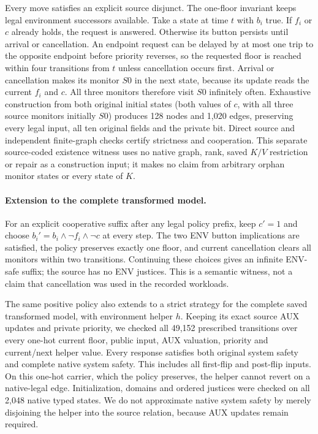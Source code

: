Every move satisfies an explicit source disjunct. The one-floor invariant
keeps legal environment successors available. Take a state at time $t$
with $b_i$ true. If $f_i$ or $c$ already holds, the request is answered.
Otherwise its button persists until arrival or cancellation. An endpoint
request can be delayed by at most one trip to the opposite endpoint
before priority reverses, so the requested floor is reached within four
transitions from $t$ unless cancellation occurs first. Arrival or
cancellation makes its monitor $S0$ in the next state, because its
update reads the current $f_i$ and $c$. All three monitors therefore visit $S0$ infinitely often. Exhaustive
construction from both original initial states (both values of $c$, with
all three source monitors initially $S0$) produces 128 nodes and
1,020 edges, preserving every legal input, all ten original fields and
the private bit. Direct source and independent finite-graph checks certify
strictness and cooperation. This separate source-coded existence witness
uses no native graph, rank, saved $K/V$ restriction or repair as a
construction input; it makes no claim from arbitrary orphan monitor
states or every state of $K$.

\paragraph{Extension to the complete transformed model.}
For an explicit cooperative suffix after any legal policy prefix, keep
$c'=1$ and choose $b_i'=b_i\land\neg f_i\land\neg c$ at every step.
The two ENV button implications are satisfied, the policy preserves
exactly one floor, and current cancellation clears all monitors within
two transitions. Continuing these choices gives an infinite ENV-safe
suffix; the source has no ENV justices. This is a semantic witness,
not a claim that cancellation was used in the recorded workloads.

The same positive policy also extends to a strict strategy for the
complete saved transformed model, with environment helper $h$. Keeping its exact source AUX updates
and private priority, we checked all 49,152 prescribed transitions over
every one-hot current floor, public input, AUX valuation, priority and
current/next helper value. Every response satisfies both original system
safety and complete native system safety. This includes all first-flip
and post-flip inputs. On this one-hot carrier, which the policy preserves,
the helper cannot revert on a native-legal edge.
Initialization, domains and ordered justices were checked on all 2,048
native typed states. We do not approximate native system safety by
merely disjoining the helper into the source relation, because AUX
updates remain required.

